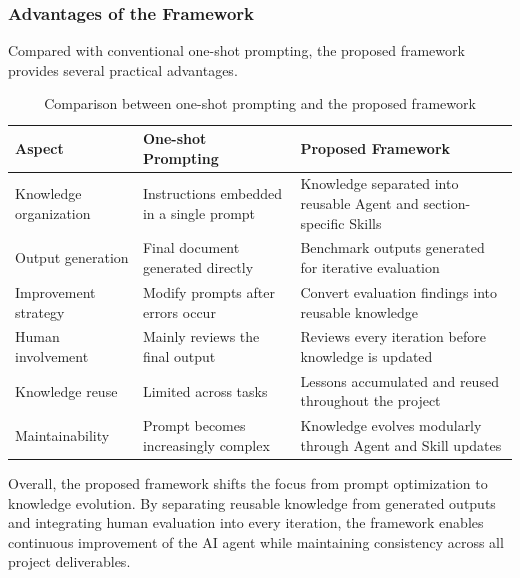 \subsubsection{Advantages of the Framework}

Compared with conventional one-shot prompting, the proposed framework provides several practical advantages.

\begin{table}[H]
	\centering
	\caption{Comparison between one-shot prompting and the proposed framework}
	\label{tab:comparison}

	\begin{tabularx}{\linewidth}{>{\raggedright\arraybackslash}p{4cm}XX}
		\toprule
		\textbf{Aspect}
		 &
		\textbf{One-shot Prompting}
		 &
		\textbf{Proposed Framework}
		\\
		\midrule

		Knowledge organization
		 &
		Instructions embedded in a single prompt
		 &
		Knowledge separated into reusable Agent and section-specific Skills
		\\

		Output generation
		 &
		Final document generated directly
		 &
		Benchmark outputs generated for iterative evaluation
		\\

		Improvement strategy
		 &
		Modify prompts after errors occur
		 &
		Convert evaluation findings into reusable knowledge
		\\

		Human involvement
		 &
		Mainly reviews the final output
		 &
		Reviews every iteration before knowledge is updated
		\\

		Knowledge reuse
		 &
		Limited across tasks
		 &
		Lessons accumulated and reused throughout the project
		\\

		Maintainability
		 &
		Prompt becomes increasingly complex
		 &
		Knowledge evolves modularly through Agent and Skill updates
		\\

		\bottomrule
	\end{tabularx}

\end{table}

Overall, the proposed framework shifts the focus from prompt optimization to knowledge evolution. By separating reusable knowledge from generated outputs and integrating human evaluation into every iteration, the framework enables continuous improvement of the AI agent while maintaining consistency across all project deliverables.
